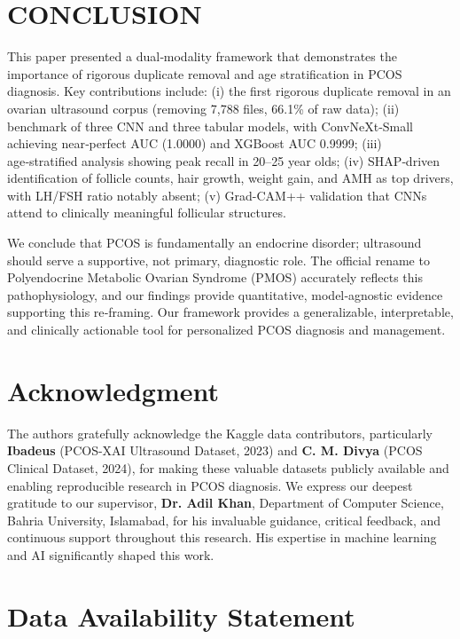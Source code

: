 \documentclass[conference]{IEEEtran}
\begin{document}
\section{CONCLUSION}

This paper presented a dual‑modality framework that demonstrates the importance of rigorous duplicate removal and age stratification in PCOS diagnosis. Key contributions include: (i) the first rigorous duplicate removal in an ovarian ultrasound corpus (removing 7,788 files, 66.1\% of raw data); (ii) benchmark of three CNN and three tabular models, with ConvNeXt‑Small achieving near‑perfect AUC (1.0000) and XGBoost AUC 0.9999; (iii) age‑stratified analysis showing peak recall in 20–25 year olds; (iv) SHAP‑driven identification of follicle counts, hair growth, weight gain, and AMH as top drivers, with LH/FSH ratio notably absent; (v) Grad-CAM++ validation that CNNs attend to clinically meaningful follicular structures.

We conclude that PCOS is fundamentally an endocrine disorder; ultrasound should serve a supportive, not primary, diagnostic role. The official rename to Polyendocrine Metabolic Ovarian Syndrome (PMOS) \cite{TeedeLancet2026} accurately reflects this pathophysiology, and our findings provide quantitative, model‑agnostic evidence supporting this re‑framing. Our framework provides a generalizable, interpretable, and clinically actionable tool for personalized PCOS diagnosis and management.

\section*{Acknowledgment}

The authors gratefully acknowledge the Kaggle data contributors, particularly \textbf{Ibadeus} (PCOS-XAI Ultrasound Dataset, 2023) and \textbf{C. M. Divya} (PCOS Clinical Dataset, 2024), for making these valuable datasets publicly available and enabling reproducible research in PCOS diagnosis. We express our deepest gratitude to our supervisor, \textbf{Dr. Adil Khan}, Department of Computer Science, Bahria University, Islamabad, for his invaluable guidance, critical feedback, and continuous support throughout this research. His expertise in machine learning and AI significantly shaped this work. 

\section*{Data Availability Statement}
\end{document}
